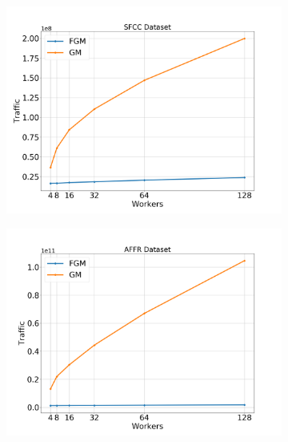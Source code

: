 \begin{figure}[H]
    \centering
    \begin{subfigure}[b]{0.45\textwidth}
        \centering
        \includegraphics[width=\textwidth]{./images/results/sfc-plots/exp_Fig_3_3.png}
        \caption{}
    \end{subfigure}
    \hfill
    \begin{subfigure}[b]{0.45\textwidth}
        \centering
        \includegraphics[width=\textwidth]{./images/results/amazon-plots/exp_Fig_3_3.png}
        \caption{}
    \end{subfigure}
    \caption{}
    \label{fig:sfcc-affr_3_3}
\end{figure}

